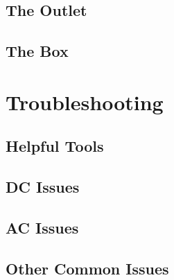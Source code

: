 \documentclass{article}
\begin{document}
\subsection{The Outlet}
\blindtext
\subsection{The Box}
\blindtext
\section{Troubleshooting}
\subsection{Helpful Tools}
\blindtext
\subsection{DC Issues}
\blindtext
\subsection{AC Issues}
\blindtext
\subsection{Other Common Issues}
\blindtext
\end{document}
